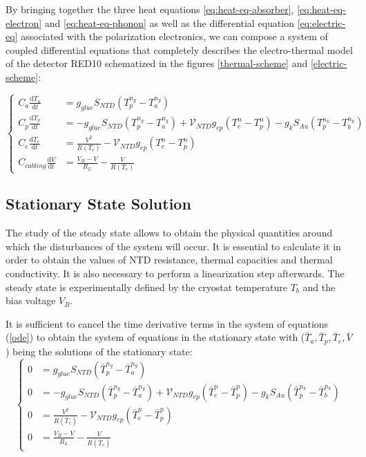 By bringing together the three heat equations \ref{eq:heat-eq-absorber}, \ref{eq:heat-eq-electron} and \ref{eq:heat-eq-phonon} as well as the differential equation \ref{eq:electric-eq} associated with the polarization electronics, we can compose a system of coupled differential equations that completely describes the electro-thermal model of the detector RED10 schematized in the figures \ref{thermal-scheme} and \ref{electric-scheme}:

\begin{equation}
\begin{cases}
\label{eq:ethem-system}
\displaystyle C_a \frac{\mathrm{d} T_a}{\mathrm{d} t} &= g_{glue} S_{NTD} \left( T_p^{n_g} - T_a^{n_g} \right) \\[10pt]
\displaystyle C_p \frac{\mathrm{d} T_p}{\mathrm{d} t}
&=
-g_{glue} S_{NTD} \left( T_p^{n_g} - T_a^{n_g} \right) 
+ \mathcal{V}_{NTD} g_{ep} \left( T_e^{n} - T_p^{n} \right)
- g_k S_{Au} \left( T_p^{n_k} - T_b^{n_k} \right) \\[10pt]
\displaystyle C_e \frac{\mathrm{d} T_e}{\mathrm{d} t} &= \frac{V^2}{R(T_e)} - \mathcal{V}_{NTD} g_{ep} \left( T_e^{n} - T_p^{n} \right) \\[10pt]
\displaystyle C_{cabling} \frac{\mathrm{d} V}{\mathrm{d} t} &= \frac{V_B - V}{R_L} - \frac{V}{R(T_e)}
 \end{cases}
\end{equation}


\subsection{Stationary State Solution}
\label{par:staionnary-state}

The study of the steady state allows to obtain the physical quantities around which the disturbances of the system will occur. It is essential to calculate it in order to obtain the values of NTD resistance, thermal capacities and thermal conductivity. It is also necessary to perform a linearization step afterwards. The steady state is experimentally defined by the cryostat temperature $T_b$ and the bias voltage $V_B$. 

It is sufficient to cancel the time derivative terms in the system of equations (\ref{ode}) to obtain the system of equations in the stationary state with ($\bar{T}_a, \bar{T}_p, \bar{T}_e, \bar{V}$) being the solutions of the stationary state:
\begin{equation}
\begin{cases}
\label{eq:ethem-system-stationnary}
0 &= g_{glue} S_{NTD} \left( \bar{T}_p^{n_g} - \bar{T}_a^{n_g} \right) \nonumber \\
0 &= -g_{glue} S_{NTD} \left( \bar{T}_p^{n_g} - \bar{T}_a^{n_g} \right) + \mathcal{V}_{NTD}  g_{ep} \left( \bar{T}_e^{n} - \bar{T}_p^{n} \right) - g_k S_{Au} \left( \bar{T}_p^{n_k} - \bar{T}_b^{n_k} \right) \nonumber \\
0 &= \frac{V^2}{R(\bar{T}_e)} - \mathcal{V}_{NTD} g_{ep} \left( \bar{T}_e^{n} - \bar{T}_p^{n} \right) \nonumber \\
0 &= \frac{V_B - V}{R_L} - \frac{V}{R(\bar{T}_e)}
 \end{cases}
\end{equation}

